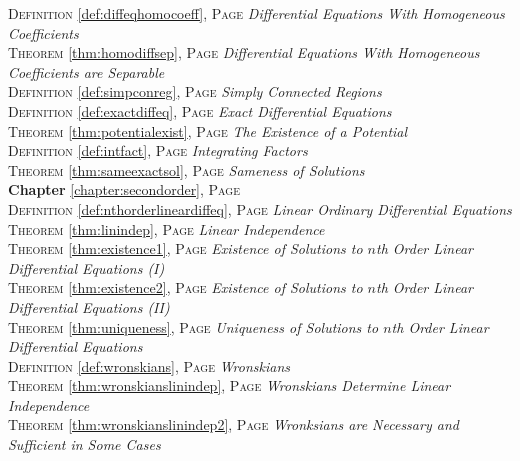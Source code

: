 \begin{multicols}{2}
{\textsc{Definition} \ref{def:diffeqhomocoeff}, \textsc{Page} \pageref{def:diffeqhomocoeff} \textit{Differential Equations With Homogeneous Coefficients} \\
\textsc{Theorem} \ref{thm:homodiffsep}, \textsc{Page} \pageref{thm:homodiffsep} \textit{Differential Equations With Homogeneous Coefficients are Separable} \\
\textsc{Definition} \ref{def:simpconreg}, \textsc{Page} \pageref{def:simpconreg} \textit{Simply Connected Regions} \\
\textsc{Definition} \ref{def:exactdiffeq}, \textsc{Page} \pageref{def:exactdiffeq} \textit{Exact Differential Equations} \\
\textsc{Theorem} \ref{thm:potentialexist}, \textsc{Page} \pageref{thm:potentialexist} \textit{The Existence of a Potential} \\
\textsc{Definition} \ref{def:intfact}, \textsc{Page} \pageref{def:intfact} \textit{Integrating Factors} \\
\textsc{Theorem} \ref{thm:sameexactsol}, \textsc{Page} \pageref{thm:sameexactsol} \textit{Sameness of Solutions} \\
\textbf{Chapter} \ref{chapter:secondorder}, \textsc{Page} \pageref{chapter:secondorder} \\
\textsc{Definition} \ref{def:nthorderlineardiffeq}, \textsc{Page} \pageref{def:nthorderlineardiffeq} \textit{Linear Ordinary Differential Equations} \\
\textsc{Theorem} \ref{thm:linindep}, \textsc{Page} \pageref{thm:linindep} \textit{Linear Independence} \\
\textsc{Theorem} \ref{thm:existence1}, \textsc{Page} \pageref{thm:existence1} \textit{Existence of Solutions to \(n\)th Order Linear Differential Equations (I)} \\
\textsc{Theorem} \ref{thm:existence2}, \textsc{Page} \pageref{thm:existence2} \textit{Existence of Solutions to \(n\)th Order Linear Differential Equations (II)} \\
\textsc{Theorem} \ref{thm:uniqueness}, \textsc{Page} \pageref{thm:uniqueness} \textit{Uniqueness of Solutions to \(n\)th Order Linear Differential Equations} \\
\textsc{Definition} \ref{def:wronskians}, \textsc{Page} \pageref{def:wronskians} \textit{Wronskians} \\
\textsc{Theorem} \ref{thm:wronskianslinindep}, \textsc{Page} \pageref{thm:wronskianslinindep} \textit{Wronskians Determine Linear Independence} \\
\textsc{Theorem} \ref{thm:wronskianslinindep2}, \textsc{Page} \pageref{thm:wronskianslinindep2} \textit{Wronksians are Necessary and Sufficient in Some Cases} \\
}
\end{multicols}
